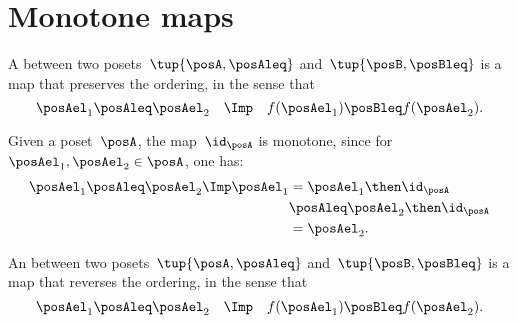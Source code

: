 \section{Monotone maps}\label{sec:monotonicity-monotone-maps}

\begin{definition}
  \label{def:monotone}
  A \emph{} between two posets~$\tup{\posA, \posAleq}$ and~$\tup{\posB, \posBleq}$ is a map that preserves the ordering, in the sense that
  \begin{equation}
    \posAel_1 \posAleq \posAel_2 \quad \Imp \quad f(\posAel_1) \posBleq f(\posAel_2).
  \end{equation}
\end{definition}
\begin{remark}
  Given a poset~$\posA$, the map~$\id_\posA$ is monotone, since for~$\posAel_1,\posAel_2\in \posA$, one has:
  \begin{equation*}
    \begin{aligned}
      \posAel_1\posAleq \posAel_2 \Imp \posAel_1&=\posAel_1\then \id_\posA\\
      &\posAleq \posAel_2\then \id_\posA \\
      &= \posAel_2.
    \end{aligned}
  \end{equation*}
\end{remark}

\begin{definition}
  \label{def:antitone}
  An \emph{} between two posets~$\tup{\posA, \posAleq}$ and~$\tup{\posB, \posBleq}$ is a map that reverses the ordering, in the sense that
  \begin{equation}
    \posAel_1 \posAleq \posAel_2 \quad \Imp \quad f(\posAel_1) \posBleq f(\posAel_2).
  \end{equation}
\end{definition}


\begin{comment}
  A monotone map is an \emph{order isomorphism} if the other direction
  of the implication holds as well:
  \begin{equation}
    a \leq_A b \quad \Leftrightarrow \quad f(a) \leq_B f(b).
  \end{equation}
\end{comment}

